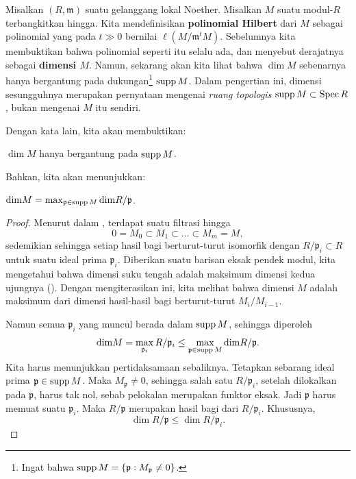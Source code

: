 Misalkan $(R, \mathfrak{m})$ suatu gelanggang lokal Noether. Misalkan $M$ suatu modul-$R$
terbangkitkan hingga.	Kita mendefinisikan \textbf{polinomial Hilbert} dari $M$ sebagai
polinomial yang pada $t \gg 0$ bernilai $\ell(M/\mathfrak{m}^tM)$. Sebelumnya kita membuktikan
bahwa polinomial seperti itu selalu ada, dan menyebut derajatnya sebagai
\textbf{dimensi $M$}. Namun, 
sekarang akan kita lihat bahwa $\dim M$ sebenarnya hanya bergantung pada dukungan\footnote{
Ingat bahwa $\operatorname{supp} M = \left\{\mathfrak{p}: M_{\mathfrak{p}}\neq 0\right\}$.} $\operatorname{supp} M$.
Dalam pengertian ini, dimensi sesungguhnya merupakan pernyataan mengenai \emph{ruang
topologis} $\operatorname{supp} M \subset \operatorname{Spec} R$, bukan mengenai $M$ itu sendiri. 


Dengan kata lain, kita akan membuktikan:
\begin{proposition} 
$\dim M$ hanya bergantung pada $\operatorname{supp} M$.
\end{proposition} 

Bahkan, kita akan menunjukkan:

\begin{proposition} 
$\mathrm{dim} M = \max_{\mathfrak{p} \in \operatorname{supp} M} \mathrm{dim} R/\mathfrak{p}$.
\end{proposition} 
\begin{proof} 
Menurut  dalam , terdapat suatu filtrasi hingga 
\[ 0 = M_0 \subset M_1 \subset \dots \subset M_m = M,  \]
sedemikian sehingga setiap hasil bagi berturut-turut isomorfik dengan $R/\mathfrak{p}_i
\subset R$
untuk suatu ideal prima $\mathfrak{p}_i$. Diberikan suatu barisan eksak pendek
modul, kita mengetahui bahwa dimensi suku tengah adalah maksimum dimensi kedua
ujungnya (). Dengan mengiterasikan ini, kita melihat bahwa
dimensi $M$ adalah maksimum dari
dimensi hasil-hasil bagi berturut-turut $M_i/M_{i-1}$.

Namun semua $\mathfrak{p}_i$ yang muncul
berada dalam $\operatorname{supp} M$, sehingga diperoleh 
\[ \mathrm{dim} M = \max_{\mathfrak{p}_i} R/\mathfrak{p}_i \leq \max_{\mathfrak{p} \in \operatorname{supp} M} \mathrm{dim} R/\mathfrak{p}.  \]
Kita harus menunjukkan pertidaksamaan sebaliknya. Tetapkan sebarang ideal prima $\mathfrak{p} \in \operatorname{supp}
M$. Maka $M_{\mathfrak{p}} \neq 0$, sehingga salah satu $R/\mathfrak{p}_i$, setelah dilokalkan
pada $\mathfrak{p}$, harus tak nol, sebab pelokalan merupakan funktor eksak. Jadi
$\mathfrak{p}$ harus memuat suatu $\mathfrak{p}_i$. Maka $R/\mathfrak{p}$ merupakan
hasil bagi dari $R/\mathfrak{p}_i$. Khususnya,
\[ \dim R/\mathfrak{p} \leq \dim R/\mathfrak{p}_i.  \]
\end{proof} 

